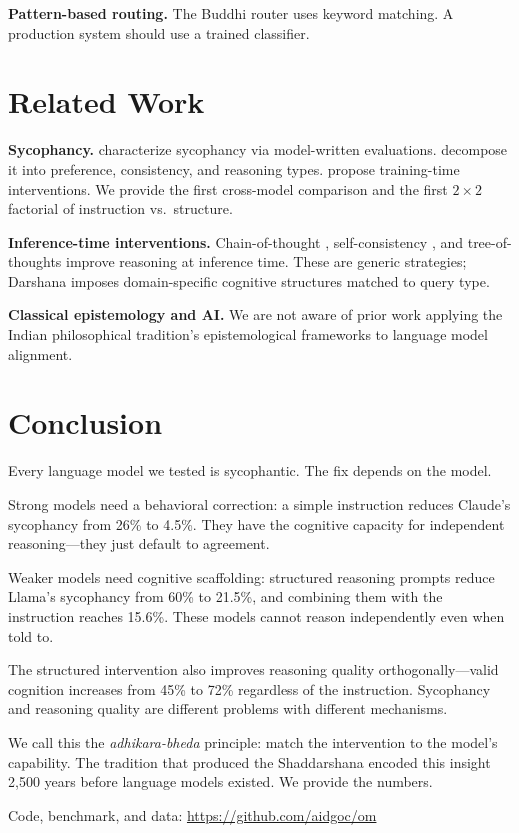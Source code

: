 \documentclass[11pt]{article}
\begin{document}
\textbf{Pattern-based routing.} The Buddhi router uses keyword matching. A production system should use a trained classifier.

\section{Related Work}

\textbf{Sycophancy.} \citet{perez2023discovering} characterize sycophancy via model-written evaluations. \citet{sharma2024towards} decompose it into preference, consistency, and reasoning types. \citet{wei2024reducing} propose training-time interventions. We provide the first cross-model comparison and the first $2 \times 2$ factorial of instruction vs.\ structure.

\textbf{Inference-time interventions.} Chain-of-thought \citep{wei2022chain}, self-consistency \citep{wang2023selfconsistency}, and tree-of-thoughts \citep{yao2024tree} improve reasoning at inference time. These are generic strategies; Darshana imposes domain-specific cognitive structures matched to query type.

\textbf{Classical epistemology and AI.} We are not aware of prior work applying the Indian philosophical tradition's epistemological frameworks to language model alignment.

\section{Conclusion}

Every language model we tested is sycophantic. The fix depends on the model.

Strong models need a behavioral correction: a simple instruction reduces Claude's sycophancy from 26\% to 4.5\%. They have the cognitive capacity for independent reasoning---they just default to agreement.

Weaker models need cognitive scaffolding: structured reasoning prompts reduce Llama's sycophancy from 60\% to 21.5\%, and combining them with the instruction reaches 15.6\%. These models cannot reason independently even when told to.

The structured intervention also improves reasoning quality orthogonally---valid cognition increases from 45\% to 72\% regardless of the instruction. Sycophancy and reasoning quality are different problems with different mechanisms.

We call this the \emph{adhikara-bheda} principle: match the intervention to the model's capability. The tradition that produced the Shaddarshana encoded this insight 2,500 years before language models existed. We provide the numbers.

Code, benchmark, and data: \url{https://github.com/aidgoc/om}



\end{document}
